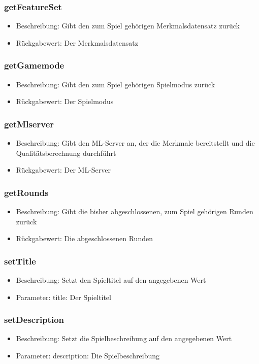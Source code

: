\documentclass[a4paper]{scrreprt}
\begin{document}
	\subsubsection{getFeatureSet}
		\begin{itemize}
			\item Beschreibung: Gibt den zum Spiel gehörigen Merkmalsdatensatz zurück
			\item Rückgabewert: Der Merkmalsdatensatz
		\end{itemize}
	\subsubsection{getGamemode}
	\begin{itemize}
		\item Beschreibung: Gibt den zum Spiel gehörigen Spielmodus zurück
		\item Rückgabewert: Der Spielmodus
	\end{itemize}
	\subsubsection{getMlserver}
	\begin{itemize}
		\item Beschreibung: Gibt den ML-Server an, der die Merkmale bereitstellt und die Qualitätsberechnung durchführt
		\item Rückgabewert: Der ML-Server
	\end{itemize}
	\subsubsection{getRounds}
	\begin{itemize}
		\item Beschreibung: Gibt die bisher abgeschlossenen, zum Spiel gehörigen Runden zurück
		\item Rückgabewert: Die abgeschlossenen Runden
		\end{itemize}
	\subsubsection{setTitle}
		\begin{itemize}
		\item Beschreibung: Setzt den Spieltitel auf den angegebenen Wert
		\item Parameter: title: Der Spieltitel
		\end{itemize}
	\subsubsection{setDescription}
		\begin{itemize}
		\item Beschreibung: Setzt die Spielbeschreibung auf den angegebenen Wert
		\item Parameter: description: Die Spielbeschreibung
		\end{itemize}
\end{document}
